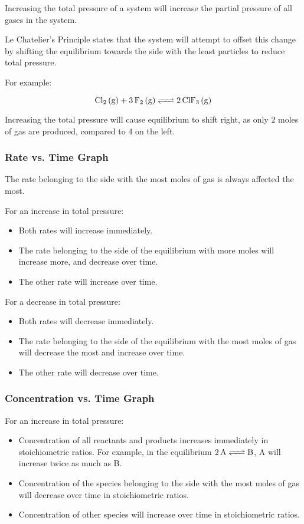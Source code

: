 \documentclass[a4paper,11pt]{article}
\begin{document}
Increasing the total pressure of a system will increase the partial pressure of
all gases in the system.

Le Chatelier's Principle states that the system will attempt to offset this
change by shifting the equilibrium towards the side with the least particles
to reduce total pressure.

For example:

$$
\ce{Cl2 (g) + 3F2 (g) <=> 2ClF3 (g)}
$$

Increasing the total pressure will cause equilibrium to shift right, as only 2
moles of gas are produced, compared to 4 on the left.


\subsubsection{Rate vs. Time Graph}

The rate belonging to the side with the most moles of gas is always affected
the most.

For an increase in total pressure:

\begin{itemize}
\item Both rates will increase immediately.
\item The rate belonging to the side of the equilibrium with more moles will
	increase more, and decrease over time.
\item The other rate will increase over time.
\end{itemize}

For a decrease in total pressure:

\begin{itemize}
\item Both rates will decrease immediately.
\item The rate belonging to the side of the equilibrium with the most moles of
	gas will decrease the most and increase over time.
\item The other rate will decrease over time.
\end{itemize}


\subsubsection{Concentration vs. Time Graph}

For an increase in total pressure:

\begin{itemize}
\item Concentration of all reactants and products increases immediately in
	stoichiometric ratios. For example, in the equilibrium $\ce{2A <=> B}$, A
	will increase twice as much as B.
\item Concentration of the species belonging to the side with the most moles
	of gas will decrease over time in stoichiometric ratios.
\item Concentration of other species will increase over time in stoichiometric
	ratios.
\end{itemize}
\end{document}
